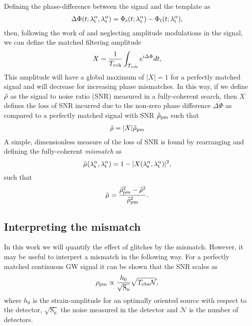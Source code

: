 \documentclass[../full_thesis/full_thesis.tex]{subfiles}
\begin{document}
Defining the phase-difference between the signal and the template as
\begin{align}
\Delta\Phi(t; {\lambda}_\textrm{t}^{\alpha}, {\lambda}_\textrm{s}^{\alpha}) = \Phi_{\textrm{s}}(t; {\lambda}_\textrm{s}^{\alpha}) - \Phi_{\textrm{t}}(t; {\lambda}_\textrm{t}^{\alpha}),
\label{eqn: phase diff}
\end{align}
then, following the work of \citet{Prix2005} and neglecting amplitude modulations
in the signal, we can define the matched filtering amplitude
\begin{equation}
X %
= \frac{1}{\Tcoh}\int_{\Tcoh}e^{i\Delta\Phi} dt,
\label{eqn: matched filtering amplitude}
\end{equation}
This amplitude will have a global maximum of $|X|=1$ for a perfectly matched
signal and will decrease for increasing phase mismatches. In this way, if we
define $\tilde{\rho}$ as the signal to noise ratio (SNR) measured in a fully-coherent
search, then $X$ defines the loss of SNR incurred
due to the non-zero phase difference $\Delta\Phi$ as compared to a perfectly matched signal
with SNR $\tilde{\rho}_{\textrm{pm}}$ such that
\begin{align}
\rhotilde = |X|\rhotilde_{\textrm{pm}}%
\end{align}
A simple, dimensionless measure of the loss of SNR is found by rearranging
and defining the fully-coherent \emph{mismatch} as
\begin{equation}
\tilde{\mu}({\lambda}_\textrm{s}^{\alpha}, {\lambda}_\textrm{t}^{\alpha}) = 1 - |X({\lambda}_\textrm{s}^{\alpha}, {\lambda}_\textrm{t}^{\alpha})|^{2},
\label{eqn: full mismatch}
\end{equation}
such that
\begin{equation}
\tilde{\mu} = \frac{\tilde{\rho}_{\mathrm{pm}}^{2} - \tilde{\rho}^{2}}
                {\tilde{\rho}^{2}_{\mathrm{pm}}}.
\label{eqn: numeric mismatch}
\end{equation}

\subsection{Interpreting the mismatch}
In this work we will quantify the effect of glitches by the mismatch. However,
it may be useful to interpret a mismatch in the following way. For a perfectly
matched continuous GW signal it can be shown \citep{Jaranowski1998} that the SNR scales as
\begin{equation}
\rho_{\mathrm{pm}} \propto \frac{h_{0}}{\sqrt{\textrm{S}_{\textrm{n}}}}
                               \sqrt{T_{\mathrm{obs}} \mathcal{N}},
\end{equation}
where $h_{0}$ is the strain-amplitude for an optimally oriented source with
respect to the detector, $\sqrt{\textrm{S}_{\textrm{n}}}$ the noise measured
in the detector and $\mathcal{N}$ is the number of detectors.
\end{document}
